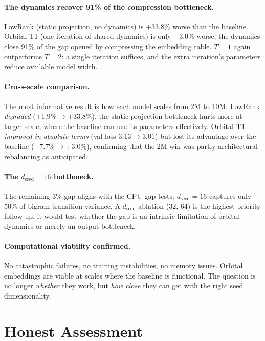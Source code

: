 \documentclass[11pt, a4paper]{article}
\theoremstyle{remark}
\begin{document}
\paragraph{The dynamics recover 91\% of the compression bottleneck.}
LowRank (static projection, no dynamics) is $+33.8\%$ worse than the baseline.
Orbital-T1 (one iteration of shared dynamics) is only $+3.0\%$ worse, the dynamics close 91\% of the gap opened by compressing the embedding table.
$T{=}1$ again outperforms $T{=}2$: a single iteration suffices, and the extra iteration's parameters reduce available model width.

\paragraph{Cross-scale comparison.}
The most informative result is how each model scales from 2M to 10M:
LowRank \emph{degraded} ($+1.9\% \to +33.8\%$), the static projection bottleneck hurts more at larger scale, where the baseline can use its parameters effectively.
Orbital-T1 \emph{improved in absolute terms} (val loss $3.13 \to 3.01$) but lost its advantage over the baseline ($-7.7\% \to +3.0\%$), confirming that the 2M win was partly architectural rebalancing as anticipated.

\paragraph{The $d_{\text{seed}}{=}16$ bottleneck.}
The remaining $3\%$ gap aligns with the CPU gap tests: $d_{\text{seed}}{=}16$ captures only 50\% of bigram transition variance.
A $d_{\text{seed}}$ ablation ($32$, $64$) is the highest-priority follow-up, it would test whether the gap is an intrinsic limitation of orbital dynamics or merely an output bottleneck.

\paragraph{Computational viability confirmed.}
No catastrophic failures, no training instabilities, no memory issues.
Orbital embeddings are viable at scales where the baseline is functional.
The question is no longer \emph{whether} they work, but \emph{how close} they can get with the right seed dimensionality.


\section{Honest Assessment}
\end{document}
